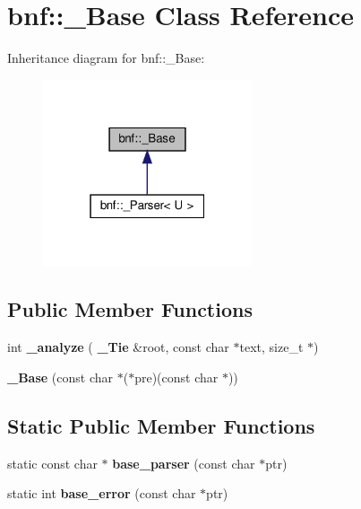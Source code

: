 \section{bnf\+:\+:\+\_\+\+Base Class Reference}
\label{classbnf_1_1___base}


Inheritance diagram for bnf\+:\+:\+\_\+\+Base\+:
\nopagebreak
\begin{figure}[H]
\begin{center}
\leavevmode
\includegraphics[width=175pt]{classbnf_1_1___base__inherit__graph}
\end{center}
\end{figure}
\subsection*{Public Member Functions}
\begin{DoxyCompactItemize}
\item 
\mbox{\label{classbnf_1_1___base_aefdb796fdec5b4172924717aa934dc4a}} 
int {\bfseries \+\_\+analyze} (\textbf{ \+\_\+\+Tie} \&root, const char $\ast$text, size\+\_\+t $\ast$)
\item 
\mbox{\label{classbnf_1_1___base_aabf499c8688286f6be285b89f101b720}} 
{\bfseries \+\_\+\+Base} (const char $\ast$($\ast$pre)(const char $\ast$))
\end{DoxyCompactItemize}
\subsection*{Static Public Member Functions}
\begin{DoxyCompactItemize}
\item 
\mbox{\label{classbnf_1_1___base_a3e28ced9cdb3f0443bcee04031fc49c9}} 
static const char $\ast$ {\bfseries base\+\_\+parser} (const char $\ast$ptr)
\item 
\mbox{\label{classbnf_1_1___base_a2f5856c7ff0791a7d9b9dbc0fc2c0fa7}} 
static int {\bfseries base\+\_\+error} (const char $\ast$ptr)
\end{DoxyCompactItemize}
